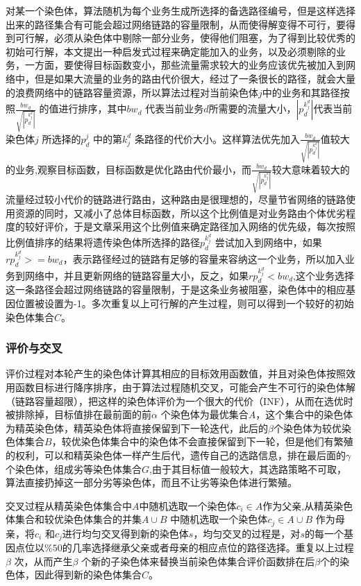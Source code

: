对某一个染色体，算法随机为每个业务生成所选择的备选路径编号，但是这样选择出来的路径集合有可能会超过网络链路的容量限制，从而使得解变得不可行，要得到可行解，必须从染色体中剔除一部分业务，使得他们阻塞，为了得到比较优秀的初始可行解，本文提出一种启发式过程来确定能加入的业务，以及必须剔除的业务，一方面，要使得目标函数变小，那些流量需求较大的业务应该优先被加入到网络中，但是如果大流量的业务的路由代价很大，经过了一条很长的路径，就会大量的浪费网络中的链路容量资源，所以算法过程对当前染色体$j$中的业务和其路径按照$\frac{bw_d}{\sqrt{|p^{k^d_j}_d|}}$ 的值进行排序，其中${bw_d}$ 代表当前业务$d$所需要的流量大小，$|p^{k^d_j}_d|$代表当前染色体$j$ 所选择的$p^j_d$ 中的第${k^d_j}$ 条路径的代价大小。这样算法优先加入$\frac{bw_d}{\sqrt{|p^{k^d_j}_d|}}$值较大的业务,观察目标函数，目标函数是优化路由代价最小，而$\frac{bw_d}{\sqrt{|p^{k^d_j}_d|}}$较大意味着较大的流量经过较小代价的链路进行路由，这种路由是很理想的，尽量节省网络的链路使用资源的同时，又减小了总体目标函数，所以这个比例值是对业务路由个体优劣程度的较好评价，于是文章采用这个比例值来确定路径加入网络的优先级，每次按照比例值排序的结果将遗传染色体所选择的路径$p^{k^d_j}_d$ 尝试加入到网络中，如果$rp^{k^d_j}_d>=bw_d$，表示路径经过的链路有足够的容量来容纳这一个业务，所以加入业务到网络中，并且更新网络的链路容量大小，反之，如果$rp^{k^d_j}_d<bw_d$,这个业务选择这一条路径会超过网络链路的容量限制，于是这条业务被阻塞，染色体中的相应基因位置被设置为-1。多次重复以上可行解的产生过程，则可以得到一个较好的初始染色体集合$C$。
\subsubsection{评价与交叉}
评价过程对本轮产生的染色体计算其相应的目标效用函数值，并且对染色体按照效用函数目标进行降序排序，由于算法过程随机交叉，可能会产生不可行的染色体解（链路容量超限），把这样的染色体评价为一个很大的代价（INF），从而在选优时被排除掉，目标值排在最前面的前$\alpha$ 个染色体为最优集合$A$，这个集合中的染色体为精英染色体，精英染色体将直接保留到下一轮迭代，此后的$\beta$个染色体为较优染色体集合$B$，较优染色体集合中的染色体不会直接保留到下一轮，但是他们有繁殖的权利，可以和精英染色体一样产生后代，遗传自己的选路信息，排在最后面的$\gamma$ 个染色体，组成劣等染色体集合$G$,由于其目标值一般较大，其选路策略不可取，算法直接扔掉这一部分劣等染色体，而且不让劣等染色体进行繁殖。

交叉过程从精英染色体集合中$A$中随机选取一个染色体$c_i \in A$作为父亲,从精英染色体集合和较优染色体集合的并集$A \cup B$ 中随机选取一个染色体$c_j \in A \cup B$ 作为母亲，将$c_i$ 和$c_j$进行均匀交叉得到新的染色体$s$，均匀交叉的过程是，对$s$的每一个基因点位以$\%50$的几率选择继承父亲或者母亲的相应点位的路径选择。重复以上过程$\beta$ 次，从而产生$\beta$ 个新的子染色体来替换当前染色体集合评价函数排在后$\beta$个的染色体，因此得到新的染色体集合$C$。
